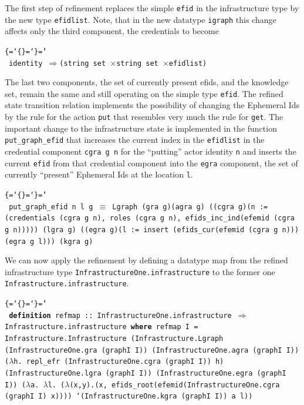 \documentclass{llncs}
\makeatletter
\newenvironment{ttbox}{\begin{alltt}\ttbraces\small\tt}%
                      {\end{alltt}}
\def\ttbraces{\let\.=\nobreak\chardef\{=`\{\chardef\}=`\}\chardef\|=`\\}
\newcommand\ttfun{\mbox{{$\Rightarrow$}}}
\newcommand\ttequiv{\mbox{{$\equiv$}}}
\newcommand\ttImp{\mbox{{$\Longrightarrow$}}}
\newcommand\ttlam{\mbox{\( \lambda \)}}
\newcommand\tttimes{\mbox{\( \times \)}}
\newcommand\ttatI{\mbox{\( @_G \)}}
\newcommand\ttrelI{\mbox{{$\to_{i}$}}}
\newcommand\ttimg{\mbox{\texttt{`}}}
\makeatother
\begin{document}
The first step of refinement replaces the simple \texttt{efid} in the infrastructure type by the
new type \texttt{efidlist}. Note, that in the new datatype \texttt{igraph} this change affects only
the third component, the credentials to become
\begin{ttbox}
   identity \ttfun (string set \tttimes string set \tttimes efidlist)
\end{ttbox}
The last two components, the set of currently present efids,
and the knowledge set, remain the same and still operating on the simple type \texttt{efid}.
%
The refined state transition relation implements the possibility of changing the Ephemeral Ids
by the rule for the action \texttt{put} that resembles very much the rule for \texttt{get}.
The important change to the infrastructure state is implemented in the function \texttt{put\_graph\_efid} that
increases the current index in the \texttt{efidlist} in the credential component \texttt{cgra g n} for
the ``putting'' actor identity \texttt{n} and inserts the current \texttt{efid} from that credential
component into the \texttt{egra} component, the set of currently ``present'' Ephemeral Ids at the location
\texttt{l}.
\begin{ttbox}
put_graph_efid n l g  \ttequiv
  Lgraph (gra g)(agra g)
         ((cgra g)(n := (credentials (cgra g n), roles (cgra g n),
                         efids_inc_ind(efemid (cgra g n)))))
         (lgra g)
         ((egra g)(l := insert (efids_cur(efemid (cgra g n)))(egra g l)))
         (kgra g)
\end{ttbox}
We can now apply the refinement by defining a datatype map from the refined infrastructure type
\texttt{InfrastructureOne.infrastructure} to the former one \texttt{Infrastructure.infrastructure}.
\begin{ttbox}
{\bf{definition}} refmap :: InfrastructureOne.infrastructure \ttfun
                          Infrastructure.infrastructure
{\bf{where}} refmap I =
  Infrastructure.Infrastructure 
    (Infrastructure.Lgraph
       (InfrastructureOne.gra (graphI I))
       (InfrastructureOne.agra (graphI I))
        (\ttlam h. repl_efr 
           (InfrastructureOne.cgra (graphI I)) h)
           (InfrastructureOne.lgra (graphI I))
           (InfrastructureOne.egra (graphI I))
           (\ttlam a. \ttlam l.
  (\ttlam (x,y).(x, efids_root(efemid(InfrastructureOne.cgra (graphI I) x))))
                       \ttimg(InfrastructureOne.kgra (graphI I)) a l))                                                    
\end{ttbox}  
\end{document}
